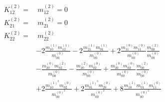 \begin{align}
\begin{aligned}
    K_{12}^{(2)} =&\ m_{12}^{(2)} = 0\\
    K_{21}^{(2)} =&\ m_{21}^{(2)} = 0\\
    K_{22}^{(2)}
    = &\
    m_{22}^{(2)}
    \\&
    - 2 \frac{ m_{10}^{(1)} m_{12}^{(1)} }{m_{00}^{(0)}}
    - 2 \frac{ m_{21}^{(1)} m_{01}^{(1)} }{m_{00}^{(0)}}
    + 2 \frac{ m_{11}^{(0)} m_{11}^{(0)} }{m_{00}^{(0)}}\frac{ m_{00}^{(2)} }{m_{00}^{(0)}}
    \\&
    - \frac{ m_{20}^{(0)} m_{02}^{(2)} }{m_{00}^{(0)}}
    - \frac{ m_{20}^{(2)} m_{02}^{(0)} }{m_{00}^{(0)}}
    + \frac{ m_{20}^{(0)} m_{02}^{(0)} }{m_{00}^{(0)}}\frac{ m_{00}^{(2)} }{m_{00}^{(0)}}
    \\&
    + 2 \frac{ m_{10}^{{(1)}^2} m_{02}^{(0)} }{m_{00}^{{(0)}^2}}
    + 2 \frac{ m_{01}^{{(1)}^2} m_{20}^{(0)} }{m_{00}^{{(0)}^2}}
    + 8 \frac{ m_{10}^{(1)}m_{01}^{(1)} m_{11}^{(0)} }{m_{00}^{{(0)}^2}}
  \end{aligned}
\end{align}
